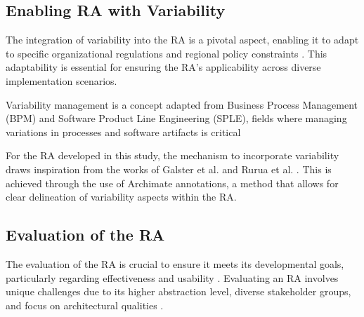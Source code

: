 \documentclass[review]{elsarticle}
\begin{document}
\subsection{Enabling RA with Variability}

The integration of variability into the RA is a pivotal aspect, enabling it to adapt to specific organizational regulations and regional policy constraints \cite{rurua2019representing}. This adaptability is essential for ensuring the RA's applicability across diverse implementation scenarios.

Variability management is a concept adapted from Business Process Management (BPM) and Software Product Line Engineering (SPLE), fields where managing variations in processes and software artifacts is critical \cite{la2009questionnaire, rosemann2007configurable, hallerbach2010capturing}

For the RA developed in this study, the mechanism to incorporate variability draws inspiration from the works of Galster et al. \cite{galster2011empirically} and Rurua et al. \cite{rurua2019representing}. This is achieved through the use of Archimate annotations, a method that allows for clear delineation of variability aspects within the RA. 




\subsection{Evaluation of the RA}

The evaluation of the RA is crucial to ensure it meets its developmental goals, particularly regarding effectiveness and usability \cite{galster2011empirically}. Evaluating an RA involves unique challenges due to its higher abstraction level, diverse stakeholder groups, and focus on architectural qualities \cite{angelov2008contracting, Avgeriou, Cioroaica, Maier}.
\end{document}

